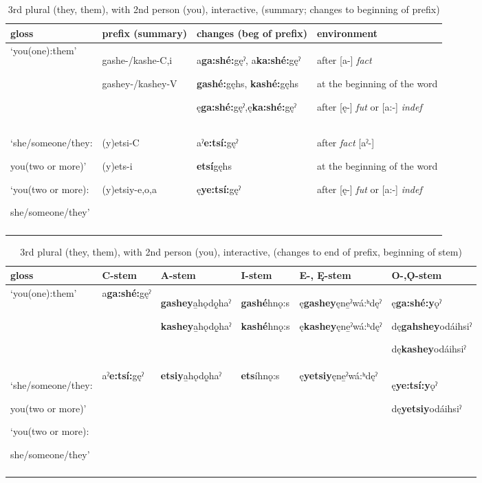 \begin{table}
\caption{3rd plural (they, them), with 2nd person (you), interactive, (summary; changes to beginning of prefix)}
\label{tab:1:3mpl2pron}
\tiny{
\begin{tabularx}{\textwidth}{XXXX}
\lsptoprule
gloss & prefix (summary) & changes (beg of prefix) & environment\\
\midrule
‘you(one):them’ & gashe-/kashe-C,i

gashey-/kashey-V & a\textbf{ga:shé:}gęˀ, a\textbf{ka:shé:}gęˀ

\textbf{gashé:}gęhs, \textbf{kashé:}gęhs

ę\textbf{ga:shé:}gęˀ,ę\textbf{ka:shé:}gęˀ & after [a-] \textit{fact}

at the beginning of the word 

after [ę-] \textit{fut} or [a:-] \textit{indef}\\
‘she/someone/they:

you(two or more)’

‘you(two or more):

she/someone/they’ & (y)etsi-C

(y)ets-i

(y)etsiy-e,o,a & aˀ\textbf{e:tsí:}gęˀ

\textbf{etsí}gęhs

ę\textbf{ye:tsí:}gęˀ & after \textit{fact} [aˀ-] 

at the beginning of the word 

after [ę-] \textit{fut} or [a:-] \textit{indef}\\
\lspbottomrule
\end{tabularx}}
\end{table}


\begin{table}
\caption{3rd plural (they, them), with 2nd person (you), interactive, (changes to end of prefix, beginning of stem)}
\label{tab:1:3mpl2pronb}
\tiny{
\begin{tabularx}{\textwidth}{XXXXXX}
\lsptoprule
gloss & C-stem & A-stem & I-stem & E-, Ę{}-stem & O-,Ǫ{}-stem\\
\midrule
‘you(one):them’ & a\textbf{ga:shé:}gęˀ & \textbf{gashey}a̱hǫdǫ̱haˀ

\textbf{kashey}a̱hǫdǫ̱haˀ & \textbf{gashé}hnǫ:s

\textbf{kashé}hnǫ:s & ę\textbf{gashey}ęne̱ˀwá:ʰdęˀ

ę\textbf{kashey}ęne̱ˀwá:ʰdęˀ & ę\textbf{ga:shé:y}ǫˀ

dę\textbf{gahshey}odáihsiˀ

dę\textbf{kashey}odáihsiˀ\\
‘she/someone/they:

you(two or more)’

‘you(two or more):

she/someone/they’ & aˀ\textbf{e:tsí:}gęˀ & \textbf{etsiy}a̱hǫdǫ̱haˀ & \textbf{ets}íhnǫ:s & ę\textbf{yetsiy}ęne̱ˀwá:ʰdęˀ & ę\textbf{ye:tsí:y}ǫˀ

dę\textbf{yetsiy}odáihsiˀ\\
\lspbottomrule
\end{tabularx}}
\end{table}


